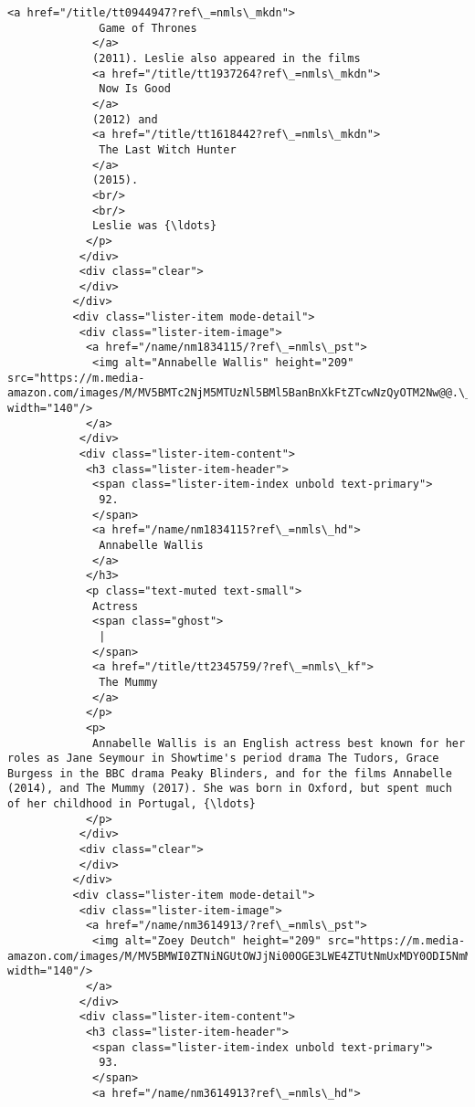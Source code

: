 \documentclass[11pt]{article}
\begin{document}
\begin{Verbatim}[commandchars=\\\{\}]
             <a href="/title/tt0944947?ref\_=nmls\_mkdn">
              Game of Thrones
             </a>
             (2011). Leslie also appeared in the films
             <a href="/title/tt1937264?ref\_=nmls\_mkdn">
              Now Is Good
             </a>
             (2012) and
             <a href="/title/tt1618442?ref\_=nmls\_mkdn">
              The Last Witch Hunter
             </a>
             (2015).
             <br/>
             <br/>
             Leslie was {\ldots}
            </p>
           </div>
           <div class="clear">
           </div>
          </div>
          <div class="lister-item mode-detail">
           <div class="lister-item-image">
            <a href="/name/nm1834115/?ref\_=nmls\_pst">
             <img alt="Annabelle Wallis" height="209" src="https://m.media-amazon.com/images/M/MV5BMTc2NjM5MTUzNl5BMl5BanBnXkFtZTcwNzQyOTM2Nw@@.\_V1\_UY209\_CR16,0,140,209\_AL\_.jpg" width="140"/>
            </a>
           </div>
           <div class="lister-item-content">
            <h3 class="lister-item-header">
             <span class="lister-item-index unbold text-primary">
              92.
             </span>
             <a href="/name/nm1834115?ref\_=nmls\_hd">
              Annabelle Wallis
             </a>
            </h3>
            <p class="text-muted text-small">
             Actress
             <span class="ghost">
              |
             </span>
             <a href="/title/tt2345759/?ref\_=nmls\_kf">
              The Mummy
             </a>
            </p>
            <p>
             Annabelle Wallis is an English actress best known for her roles as Jane Seymour in Showtime's period drama The Tudors, Grace Burgess in the BBC drama Peaky Blinders, and for the films Annabelle (2014), and The Mummy (2017). She was born in Oxford, but spent much of her childhood in Portugal, {\ldots}
            </p>
           </div>
           <div class="clear">
           </div>
          </div>
          <div class="lister-item mode-detail">
           <div class="lister-item-image">
            <a href="/name/nm3614913/?ref\_=nmls\_pst">
             <img alt="Zoey Deutch" height="209" src="https://m.media-amazon.com/images/M/MV5BMWI0ZTNiNGUtOWJjNi00OGE3LWE4ZTUtNmUxMDY0ODI5NmM0XkEyXkFqcGdeQXVyMjMwNzU2MjM@.\_V1\_UY209\_CR14,0,140,209\_AL\_.jpg" width="140"/>
            </a>
           </div>
           <div class="lister-item-content">
            <h3 class="lister-item-header">
             <span class="lister-item-index unbold text-primary">
              93.
             </span>
             <a href="/name/nm3614913?ref\_=nmls\_hd">

\end{Verbatim}
\end{document}
